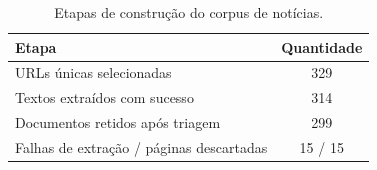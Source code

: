 \begin{table}[ht]
\centering
\caption{Etapas de construção do corpus de notícias.}
\label{tab:corpus}
\begin{tabular}{l|c}
\hline
\textbf{Etapa} & \textbf{Quantidade} \\
\hline
URLs únicas selecionadas & 329 \\
Textos extraídos com sucesso & 314 \\
Documentos retidos após triagem & 299 \\
Falhas de extração / páginas descartadas & 15 / 15 \\
\hline
\end{tabular}
\end{table}
